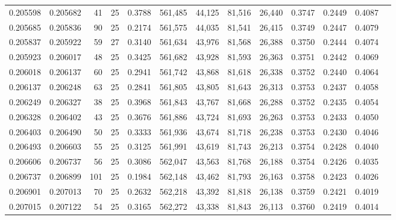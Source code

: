 \begin{tabular}{rrrrrrrrrrrrr}
0.205598 & 0.205682 &    41 &  25 &                                     0.3788 & 561,485 &  44,125 &  81,516 &  26,440 & 0.3747 & 0.2449 & 0.4087 \\
0.205685 & 0.205836 &    90 &  25 &                                     0.2174 & 561,575 &  44,035 &  81,541 &  26,415 & 0.3749 & 0.2447 & 0.4079 \\
0.205837 & 0.205922 &    59 &  27 &                                     0.3140 & 561,634 &  43,976 &  81,568 &  26,388 & 0.3750 & 0.2444 & 0.4074 \\
0.205923 & 0.206017 &    48 &  25 &                                     0.3425 & 561,682 &  43,928 &  81,593 &  26,363 & 0.3751 & 0.2442 & 0.4069 \\
0.206018 & 0.206137 &    60 &  25 &                                     0.2941 & 561,742 &  43,868 &  81,618 &  26,338 & 0.3752 & 0.2440 & 0.4064 \\
0.206137 & 0.206248 &    63 &  25 &                                     0.2841 & 561,805 &  43,805 &  81,643 &  26,313 & 0.3753 & 0.2437 & 0.4058 \\
0.206249 & 0.206327 &    38 &  25 &                                     0.3968 & 561,843 &  43,767 &  81,668 &  26,288 & 0.3752 & 0.2435 & 0.4054 \\
0.206328 & 0.206402 &    43 &  25 &                                     0.3676 & 561,886 &  43,724 &  81,693 &  26,263 & 0.3753 & 0.2433 & 0.4050 \\
0.206403 & 0.206490 &    50 &  25 &                                     0.3333 & 561,936 &  43,674 &  81,718 &  26,238 & 0.3753 & 0.2430 & 0.4046 \\
0.206493 & 0.206603 &    55 &  25 &                                     0.3125 & 561,991 &  43,619 &  81,743 &  26,213 & 0.3754 & 0.2428 & 0.4040 \\
0.206606 & 0.206737 &    56 &  25 &                                     0.3086 & 562,047 &  43,563 &  81,768 &  26,188 & 0.3754 & 0.2426 & 0.4035 \\
0.206737 & 0.206899 &   101 &  25 &                                     0.1984 & 562,148 &  43,462 &  81,793 &  26,163 & 0.3758 & 0.2423 & 0.4026 \\
0.206901 & 0.207013 &    70 &  25 &                                     0.2632 & 562,218 &  43,392 &  81,818 &  26,138 & 0.3759 & 0.2421 & 0.4019 \\
0.207015 & 0.207122 &    54 &  25 &                                     0.3165 & 562,272 &  43,338 &  81,843 &  26,113 & 0.3760 & 0.2419 & 0.4014 \\

\end{tabular}
